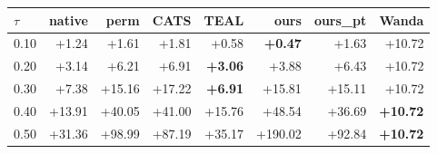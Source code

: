 \begin{tabular}{lrrrrrrr}
\toprule
$\tau$ & native & perm & CATS & TEAL & ours & ours\_pt & Wanda \\
\midrule
0.10 & +1.24 & +1.61 & +1.81 & +0.58 & \textbf{+0.47} & +1.63 & +10.72 \\
0.20 & +3.14 & +6.21 & +6.91 & \textbf{+3.06} & +3.88 & +6.43 & +10.72 \\
0.30 & +7.38 & +15.16 & +17.22 & \textbf{+6.91} & +15.81 & +15.11 & +10.72 \\
0.40 & +13.91 & +40.05 & +41.00 & +15.76 & +48.54 & +36.69 & \textbf{+10.72} \\
0.50 & +31.36 & +98.99 & +87.19 & +35.17 & +190.02 & +92.84 & \textbf{+10.72} \\
\bottomrule
\end{tabular}
